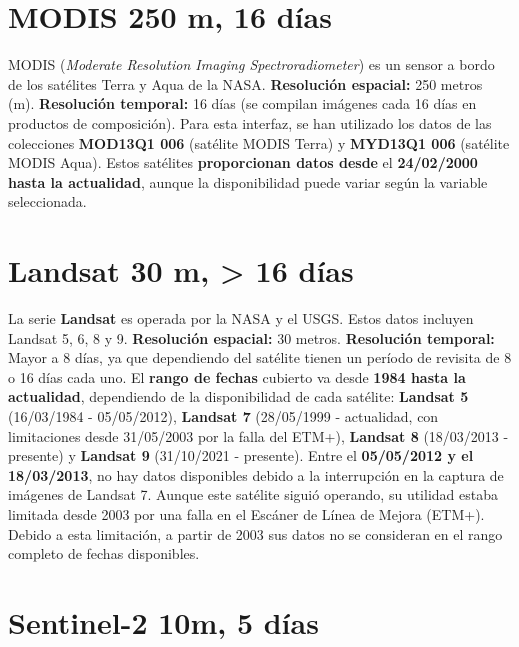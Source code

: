 \documentclass[
]{book}
\begin{document}
\section{\texorpdfstring{\textbf{MODIS 250 m, 16 días}}{MODIS 250 m, 16 días}}\label{modis-250-m-16-duxedas}

MODIS (\emph{Moderate Resolution Imaging Spectroradiometer}) es un sensor a bordo de los satélites Terra y Aqua de la NASA. \textbf{Resolución espacial:} 250 metros (m). \textbf{Resolución temporal:} 16 días (se compilan imágenes cada 16 días en productos de composición). Para esta interfaz, se han utilizado los datos de las colecciones \textbf{MOD13Q1 006} (satélite MODIS Terra) y \textbf{MYD13Q1 006} (satélite MODIS Aqua). Estos satélites \textbf{proporcionan datos desde} el \textbf{24/02/2000 hasta la actualidad}, aunque la disponibilidad puede variar según la variable seleccionada.

\section{\texorpdfstring{\textbf{Landsat 30 m, \textgreater{} 16 días}}{Landsat 30 m, \textgreater{} 16 días}}\label{landsat-30-m-16-duxedas}

La serie \textbf{Landsat} es operada por la NASA y el USGS. Estos datos incluyen Landsat 5, 6, 8 y 9. \textbf{Resolución espacial:} 30 metros. \textbf{Resolución temporal:} Mayor a 8 días, ya que dependiendo del satélite tienen un período de revisita de 8 o 16 días cada uno. El \textbf{rango de fechas} cubierto va desde \textbf{1984 hasta la actualidad}, dependiendo de la disponibilidad de cada satélite: \textbf{Landsat 5} (16/03/1984 - 05/05/2012), \textbf{Landsat 7} (28/05/1999 - actualidad, con limitaciones desde 31/05/2003 por la falla del ETM+), \textbf{Landsat 8} (18/03/2013 - presente) y \textbf{Landsat 9} (31/10/2021 - presente). Entre el \textbf{05/05/2012 y el 18/03/2013}, no hay datos disponibles debido a la interrupción en la captura de imágenes de Landsat 7. Aunque este satélite siguió operando, su utilidad estaba limitada desde 2003 por una falla en el Escáner de Línea de Mejora (ETM+). Debido a esta limitación, a partir de 2003 sus datos no se consideran en el rango completo de fechas disponibles.

\section{\texorpdfstring{\textbf{Sentinel-2 10m, 5 días}}{Sentinel-2 10m, 5 días}}\label{sentinel-2-10m-5-duxedas}
\end{document}
